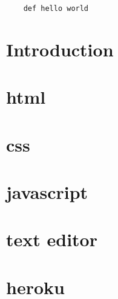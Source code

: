 \documentclass{article}
\renewcommand{\footrulewidth}{0pt}
\begin{document}
\begin{lstlisting}
	def hello world
\end{lstlisting}

\cleardoublepage



\renewcommand{\contentsname}{Inhaltsverzeichnis}
\tableofcontents
\thispagestyle{empty}%
\cleardoublepage




\listoffigures
{}
\cleardoublepage


\listoftables
{}
\cleardoublepage




\setcounter{page}{1}%




\section{Introduction}\label{sec:intro}%
\section{html}

\cleardoublepage


\section{css}
\cleardoublepage


\section{javascript}
\cleardoublepage



\section{text editor}
\cleardoublepage



\section{heroku}
\renewcommand{\footrulewidth}{1pt}
\end{document}
